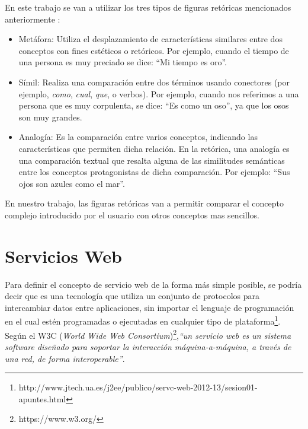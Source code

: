 En este trabajo se van a utilizar los tres tipos de figuras retóricas mencionados anteriormente \citep{TFMPaloma}: 
\begin{itemize}
	\item Metáfora: Utiliza el desplazamiento de características similares entre dos conceptos con fines estéticos o retóricos. Por ejemplo, cuando el tiempo de una persona es muy preciado se dice: ``Mi tiempo es oro''.
	
	\item Símil: Realiza una comparación entre dos términos usando conectores (por ejemplo, \textit{como}, \textit{cual}, \textit{que}, o verbos).
	Por ejemplo, cuando nos referimos a una persona que es muy corpulenta, se dice: ``Es como un oso'', ya que los osos son muy grandes.
	
	\item Analogía: Es la comparación entre varios conceptos, indicando las características que permiten dicha relación. En la retórica, una analogía es una comparación textual que resalta alguna de las similitudes semánticas entre los conceptos protagonistas de dicha comparación. Por ejemplo: ``Sus ojos son azules como el mar''.
	
\end{itemize}

En nuestro trabajo, las figuras retóricas van a permitir comparar el concepto complejo introducido por el usuario con otros conceptos mas sencillos.

\section{Servicios Web}
\label{cap:sec:serviciosweb}

Para definir el concepto de servicio web de la forma más simple posible, se podría decir que es una tecnología que utiliza un conjunto de protocolos para intercambiar datos entre aplicaciones, sin importar el lenguaje de programación en el cual estén programadas o ejecutadas en cualquier tipo de plataforma\footnote{http://www.jtech.ua.es/j2ee/publico/servc-web-2012-13/sesion01-apuntes.html}. Según el W3C (\textit{World Wide Web Consortium})\footnote{https://www.w3.org/},\textit{``un servicio web es un sistema software diseñado para soportar la interacción máquina-a-máquina, a través de una red, de forma interoperable''}.




